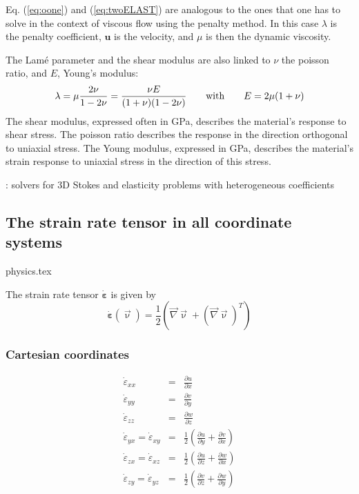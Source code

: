 

\begin{remark}
Eq. (\ref{eq:oone}) and (\ref{eq:twoELAST}) are analogous to the ones that one has to solve
in the context of viscous flow using the penalty method. In this case $\lambda$ is the penalty coefficient, 
${\bm u}$ is the velocity, and $\mu$ is then the dynamic viscosity.
\end{remark}

The Lam\'e parameter and the shear modulus are also linked to $\nu$ the poisson ratio, 
and $E$, Young's modulus:  
\[
\lambda=\mu\frac{2\nu}{1-2\nu}
=\frac{\nu E}{(1+\nu)(1-2\nu)}
\quad\quad
{\rm with}
\quad\quad
E=2\mu(1+\nu)
\]
The shear modulus, expressed often in GPa, describes the material's response to shear stress.
The poisson ratio describes the response in the direction orthogonal to uniaxial stress.
The Young modulus, expressed in GPa, describes the material's strain response to uniaxial stress in the 
direction of this stress.


\Literature: solvers for 3D Stokes and elasticity problems with
heterogeneous coefficients \cite{samb20}




\newpage
\subsection{The strain rate tensor in all coordinate systems}
\begin{flushright} {\tiny {\color{gray} physics.tex}} \end{flushright}

The strain rate tensor $\dot{\bm\varepsilon}$ is given by
\begin{equation}
\dot{\bm \varepsilon}({\vec \upnu}) = \frac{1}{2}( {\vec \nabla}{\vec \upnu}+ ({\vec \nabla}{\vec \upnu})^T) 
\end{equation}

\subsubsection{Cartesian coordinates}
\begin{eqnarray}
\dot\varepsilon_{xx} &=& \frac{\partial u}{\partial x} \\
\dot\varepsilon_{yy} &=& \frac{\partial v}{\partial y} \\
\dot\varepsilon_{zz} &=& \frac{\partial w}{\partial z} \\
\dot\varepsilon_{yx} =
\dot\varepsilon_{xy} &=& \frac{1}{2} \left( \frac{\partial u}{\partial y} + \frac{\partial v}{\partial x}  \right)\\
\dot\varepsilon_{zx} =
\dot\varepsilon_{xz} &=& \frac{1}{2} \left( \frac{\partial u}{\partial z} + \frac{\partial w}{\partial x}  \right)\\
\dot\varepsilon_{zy} =
\dot\varepsilon_{yz} &=& \frac{1}{2} \left( \frac{\partial v}{\partial z} + \frac{\partial w}{\partial y}  \right)
\end{eqnarray}

